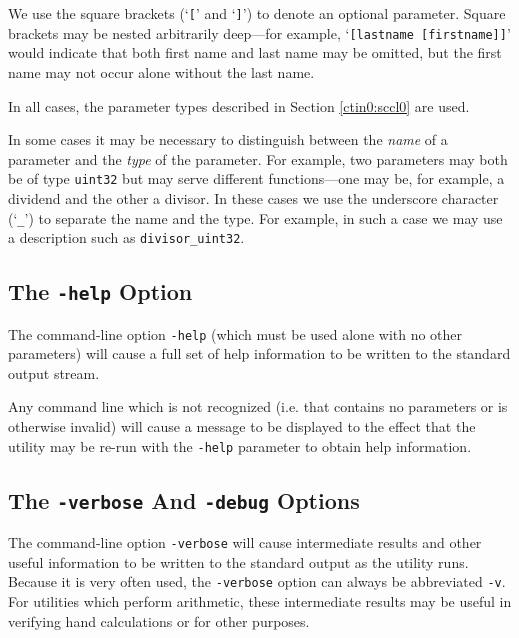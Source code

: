 We use the square brackets (`\texttt{[}' and `\texttt{]}') to denote
an optional parameter.  Square brackets may be nested arbitrarily
deep---for example, `\texttt{[lastname [firstname]]}' would 
indicate that both first name and last name may be omitted, but
the first name may not occur alone without the last name.

In all cases, the parameter types described in Section
\ref{ctin0:sccl0}
are used.

In some cases it may be necessary to distinguish between the 
\emph{name} of a parameter and the \emph{type} of the parameter.
For example, two parameters may both be of type \texttt{uint32} 
but may serve different functions---one may be, for example,
a dividend and the other a divisor.  In these cases we use
the underscore character (`\texttt{\_}') to separate
the name and the type.  For example, in such a case we may
use a description such as \texttt{divisor\_uint32}.

\subsection{The \texttt{-help} Option}
\label{cdcm0:sccl0:shel0}

The command-line option \texttt{-help} (which must be used alone with no
other parameters) will cause a full set of help information to be written
to the standard output stream.

Any command line which is not recognized (i.e. that contains no parameters or is
otherwise invalid) will cause a message to be displayed to the effect that
the utility may be re-run with the \texttt{-help} parameter to obtain help
information.

\subsection{The \texttt{-verbose} And \texttt{-debug} Options}
\label{cdcm0:sccl0:sver0}

The command-line option \texttt{-verbose} will cause intermediate results and other
useful information to be written to the standard output as the utility runs.
Because it is very often
used, the \texttt{-verbose} option
can always be abbreviated \texttt{-v}.
For utilities which perform arithmetic, these intermediate results may be useful
in verifying hand calculations or for other purposes.

